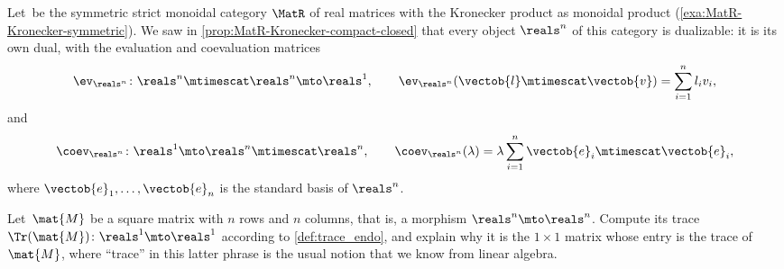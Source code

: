 \begin{gradedexercise}
    \label{ex:LinearAlgebraTrace}
    Let~\CatC be the symmetric strict monoidal category $\MatR$ of real matrices with the Kronecker product as monoidal product (\cref{exa:MatR-Kronecker-symmetric}).
    We saw in \cref{prop:MatR-Kronecker-compact-closed} that every object $\reals^n$ of this category is dualizable: it is its own dual, with the evaluation and coevaluation matrices
    \begin{equation}
        \ev_{\reals^n} \colon \reals^n \mtimescat \reals^n \mto \reals^1,
        \qquad
        \ev_{\reals^n}(\vectob{l} \mtimescat \vectob{v}) = \sum_{i=1}^n l_i v_i,
    \end{equation}
    and
    \begin{equation}
        \coev_{\reals^n} \colon \reals^1 \mto \reals^n \mtimescat \reals^n,
        \qquad
        \coev_{\reals^n}(\lambda) = \lambda \sum_{i=1}^n \vectob{e}_i \mtimescat \vectob{e}_i,
    \end{equation}
    where $\vectob{e}_1, \ldots, \vectob{e}_n$ is the standard basis of $\reals^n$.

    Let~$\mat{M}$ be a square matrix with $n$ rows and $n$ columns, that is, a morphism $\reals^n \mto \reals^n$.
    Compute its trace~$\Tr(\mat{M}) \colon \reals^1 \mto \reals^1$ according to \cref{def:trace_endo}, and explain why it is the $1 \times 1$ matrix whose entry is the trace of~$\mat{M}$, where ``trace'' in this latter phrase is the usual notion that we know from linear algebra.
\end{gradedexercise}


